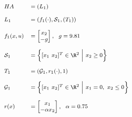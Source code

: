 \begin{center}
    \begin{minipage}[l]{0.3\columnwidth}
        \begin{center}
        \end{center}
    \end{minipage}
    \begin{minipage}[l]{0.6\columnwidth}
        \begin{equation*}
            \footnotesize
            \begin{array}{ll}
                HA            & = (L_1)                                                             \\
                & {\tiny ~}                                                           \\
                L_1           & = (f_1(\cdot),\mathcal{S}_1,(T_1))                                  \\
                & {\tiny ~}                                                           \\
                f_1(x,u)      & = \begin{bmatrix}
                                      x_2 \\ -g
                \end{bmatrix}, ~~ g = 9.81              \\
                & {\tiny ~}          \\
                \mathcal{S}_1              & = \Big \{ [x_1 ~x_2]^T \in \R^2~\Big |~ x_2 \geq 0 \Big \}                                                           \\
                & {\tiny ~}                                      \\
                T_1              & = (\mathcal{G}_1,r_1(\cdot),1)                                                           \\
                & {\tiny ~} \\
                \mathcal{G}_1              & = \Big \{ [x_1 ~x_2]^T \in \R^2~\Big |~ x_1 = 0,~x_2 \leq 0 \Big \}                                                           \\
                & {\tiny ~}                                               \\
                r(x)          & = \begin{bmatrix}
                                      x_1 \\ -\alpha x_2
                \end{bmatrix}, ~~ \alpha = 0.75
            \end{array}
        \end{equation*}
    \end{minipage}
     \label{fig:bouncingBall}
\end{center}


